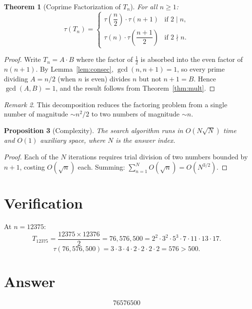 \documentclass[12pt]{article}
\newtheorem{theorem}{Theorem}
\newtheorem{proposition}[theorem]{Proposition}
\theoremstyle{definition}
\theoremstyle{remark}
\newtheorem{remark}[theorem]{Remark}
\begin{document}
\begin{theorem}[Coprime Factorization of $T_n$]
\label{thm:main}
For all $n \ge 1$:
\[
\tau(T_n) = \begin{cases}
\tau\!\left(\dfrac{n}{2}\right) \cdot \tau(n+1) & \text{if } 2 \mid n, \\[8pt]
\tau(n) \cdot \tau\!\left(\dfrac{n+1}{2}\right) & \text{if } 2 \nmid n.
\end{cases}
\]
\end{theorem}

\begin{proof}
Write $T_n = A \cdot B$ where the factor of $\frac{1}{2}$ is absorbed into the even factor of $n(n+1)$. By Lemma~\ref{lem:consec}, $\gcd(n, n+1)=1$, so every prime dividing $A = n/2$ (when $n$ is even) divides $n$ but not $n+1=B$. Hence $\gcd(A,B) = 1$, and the result follows from Theorem~\ref{thm:mult}.
\end{proof}

\begin{remark}
This decomposition reduces the factoring problem from a single number of magnitude $\sim n^2/2$ to two numbers of magnitude $\sim n$.
\end{remark}

\begin{proposition}[Complexity]
The search algorithm runs in $O(N\sqrt{N})$ time and $O(1)$ auxiliary space, where $N$ is the answer index.
\end{proposition}

\begin{proof}
Each of the $N$ iterations requires trial division of two numbers bounded by $n+1$, costing $O(\sqrt{n})$ each. Summing: $\sum_{n=1}^{N} O(\sqrt{n}) = O(N^{3/2})$.
\end{proof}

\section{Verification}

At $n = 12375$:
\[
T_{12375} = \frac{12375 \times 12376}{2} = 76{,}576{,}500 = 2^2 \cdot 3^2 \cdot 5^3 \cdot 7 \cdot 11 \cdot 13 \cdot 17.
\]
\[
\tau(76{,}576{,}500) = 3 \cdot 3 \cdot 4 \cdot 2 \cdot 2 \cdot 2 \cdot 2 = 576 > 500.
\]

\section{Answer}

\[
\boxed{76576500}
\]
\end{document}
